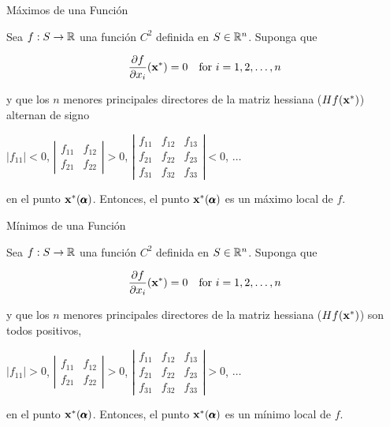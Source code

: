 \documentclass[10pt,aspectratio=169]{beamer}  %
\begin{document}
\begin{frame}{Máximos de una Función}
	
	Sea $f: S \rightarrow \mathbb{R}$ una función $C^2$ definida en $S \in \mathbb{R}^n$. Suponga que 

	\[
		\frac{\partial f}{\partial x_i}(\mathbf{x}^*)= 0 \quad \text{for } i = 1, 2, \dots, n
	\]

	y que los $n$ menores principales directores de la matriz hessiana ($Hf(\mathbf{x}^*)$) alternan de signo

	$\left| f_{11} \right| < 0$, \quad $\left| \begin{array}{cc}
		f_{11} & f_{12} \\
		f_{21} & f_{22}
	\end{array}\right| > 0$, \quad $\left| \begin{array}{ccc}
		f_{11} & f_{12} & f_{13} \\
		f_{21} & f_{22} & f_{23} \\
		f_{31} & f_{32} & f_{33}
	\end{array}\right| < 0$, $\dots$

	en el punto $\mathbf{x}^*(\pmb{\alpha})$. Entonces, el punto $\mathbf{x}^*(\pmb{\alpha})$ es un máximo local de $f$.


\end{frame}

\begin{frame}{Mínimos de una Función}
	
	Sea $f: S \rightarrow \mathbb{R}$ una función $C^2$ definida en $S \in \mathbb{R}^n$. Suponga que 

	\[
		\frac{\partial f}{\partial x_i}(\mathbf{x}^*)= 0 \quad \text{for } i = 1, 2, \dots, n
	\]

	y que los $n$ menores principales directores de la matriz hessiana ($Hf(\mathbf{x}^*)$) son todos positivos,

	$\left| f_{11} \right| > 0$, \quad $\left| \begin{array}{cc}
		f_{11} & f_{12} \\
		f_{21} & f_{22}
	\end{array}\right| > 0$, \quad $\left| \begin{array}{ccc}
		f_{11} & f_{12} & f_{13} \\
		f_{21} & f_{22} & f_{23} \\
		f_{31} & f_{32} & f_{33}
	\end{array}\right| > 0$, $\dots$

	en el punto $\mathbf{x}^*(\pmb{\alpha})$. Entonces, el punto $\mathbf{x}^*(\pmb{\alpha})$ es un mínimo local de $f$.

\end{frame}
\end{document}
